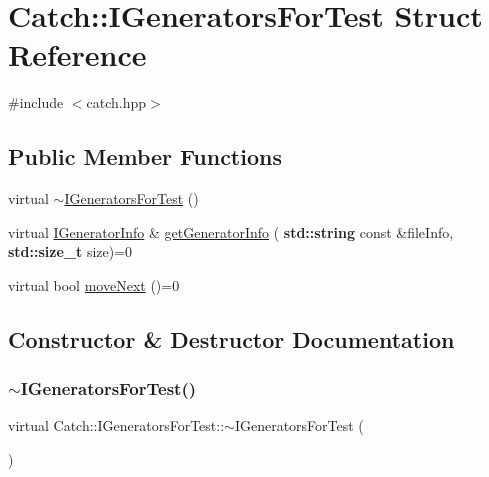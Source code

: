 \hypertarget{struct_catch_1_1_i_generators_for_test}{}\section{Catch\+:\+:I\+Generators\+For\+Test Struct Reference}
\label{struct_catch_1_1_i_generators_for_test}


{\ttfamily \#include $<$catch.\+hpp$>$}

\subsection*{Public Member Functions}
\begin{DoxyCompactItemize}
\item 
virtual \hyperlink{struct_catch_1_1_i_generators_for_test_a05725e76ee92e498f73479a61f3e3c7c}{$\sim$\+I\+Generators\+For\+Test} ()
\item 
virtual \hyperlink{struct_catch_1_1_i_generator_info}{I\+Generator\+Info} \& \hyperlink{struct_catch_1_1_i_generators_for_test_a180d84e858840188e4c3788e47eefdb0}{get\+Generator\+Info} (\textbf{ std\+::string} const \&file\+Info, \textbf{ std\+::size\+\_\+t} size)=0
\item 
virtual bool \hyperlink{struct_catch_1_1_i_generators_for_test_adab31832d529fc584fd63164e0a1c8ad}{move\+Next} ()=0
\end{DoxyCompactItemize}


\subsection{Constructor \& Destructor Documentation}
\mbox{\label{struct_catch_1_1_i_generators_for_test_a05725e76ee92e498f73479a61f3e3c7c}} 
\subsubsection{\texorpdfstring{$\sim$\+I\+Generators\+For\+Test()}{~IGeneratorsForTest()}}
{\footnotesize\ttfamily virtual Catch\+::\+I\+Generators\+For\+Test\+::$\sim$\+I\+Generators\+For\+Test (\begin{DoxyParamCaption}{ }\end{DoxyParamCaption})\hspace{0.3cm}{\ttfamily [virtual]}}



